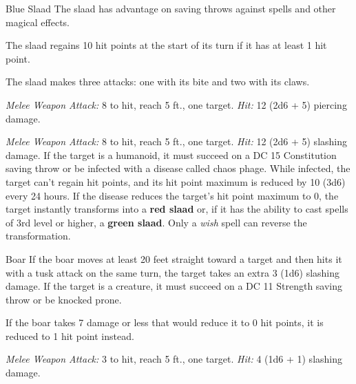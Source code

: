 \documentclass[10pt,a4paper,twoside,bg=print,twocolumn,openany,nodeprecatedcode]{dndbook}
\begin{document}
\begin{DndMonster}[float=t]{Blue Slaad}
\DndMonsterBasics[
armor-class = {15 (natural armor)},
hit-points = {\DndDice{13d10 + 52}},
speed = {30 ft.}
]
\DndMonsterAbilityScores[
 str = 20,
 dex = 15,
 con = 18,
 int = 7,
 wis = 7,
 cha = 9
]
\DndMonsterDetails[
skills = {Perception +1},
damage-resistances = {acid, cold, fire, lightning, thunder},
senses = {darkvision 60 ft., passive perception 11},
languages = {Slaad, telepathy 60 ft.},
challenge = 7,
]
The slaad has advantage on saving throws against spells and other magical effects.

The slaad regains 10 hit points at the start of its turn if it has at least 1 hit point.

The slaad makes three attacks: one with its bite and two with its claws.

\textsl{Melee Weapon Attack:} 8 to hit, reach 5 ft., one target. \textsl{Hit:} 12 (2d6 + 5) piercing damage.

\textsl{Melee Weapon Attack:} 8 to hit, reach 5 ft., one target. \textsl{Hit:} 12 (2d6 + 5) slashing damage. If the target is a humanoid, it must succeed on a DC 15 Constitution saving throw or be infected with a disease called chaos phage. While infected, the target can't regain hit points, and its hit point maximum is reduced by 10 (3d6) every 24 hours. If the disease reduces the target's hit point maximum to 0, the target instantly transforms into a \textbf{red slaad} or, if it has the ability to cast spells of 3rd level or higher, a \textbf{green slaad}. Only a \textit{wish} spell can reverse the transformation.

\end{DndMonster}



\begin{DndMonster}[float=t]{Boar}
\DndMonsterBasics[
armor-class = {11 (natural armor)},
hit-points = {\DndDice{2d8 + 2}},
speed = {40 ft.}
]
\DndMonsterAbilityScores[
 str = 13,
 dex = 11,
 con = 12,
 int = 2,
 wis = 9,
 cha = 5
]
\DndMonsterDetails[
challenge = 1/4,
]
If the boar moves at least 20 feet straight toward a target and then hits it with a tusk attack on the same turn, the target takes an extra 3 (1d6) slashing damage. If the target is a creature, it must succeed on a DC 11 Strength saving throw or be knocked prone.

If the boar takes 7 damage or less that would reduce it to 0 hit points, it is reduced to 1 hit point instead.

\textsl{Melee Weapon Attack:} 3 to hit, reach 5 ft., one target. \textsl{Hit:} 4 (1d6 + 1) slashing damage.

\end{DndMonster}
\end{document}
